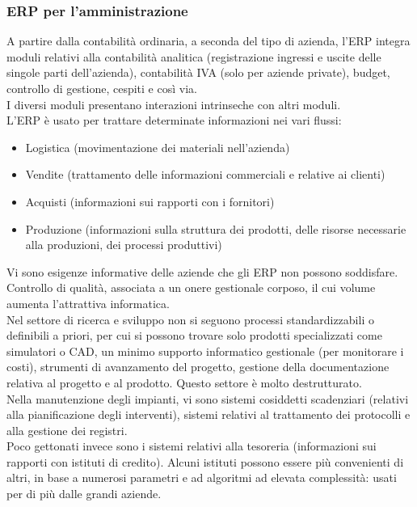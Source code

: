 \subsubsection{ERP per l'amministrazione}
\label{subs:ERP per l'amministrazione}
A partire dalla contabilit\`a ordinaria, a seconda del tipo di azienda, l'ERP integra moduli
relativi alla contabilit\`a analitica (registrazione ingressi e uscite delle singole parti dell'azienda),
contabilit\`a IVA (solo per aziende private), budget, controllo di gestione, cespiti e cos\`i via.\\
I diversi moduli presentano interazioni intrinseche con altri moduli. \\
L'ERP \`e usato per trattare determinate informazioni nei vari flussi:
\begin{itemize}
	\item Logistica (movimentazione dei materiali nell'azienda)
	\item Vendite (trattamento delle informazioni commerciali e relative ai clienti)
	\item Acquisti (informazioni sui rapporti con i fornitori)
	\item Produzione (informazioni sulla struttura dei prodotti, delle risorse necessarie
	alla produzioni, dei processi produttivi)
\end{itemize}
Vi sono esigenze informative delle aziende che gli ERP non possono soddisfare.\\
Controllo di qualit\`a, associata a un onere gestionale corposo, il cui volume aumenta
l'attrattiva informatica.\\
Nel settore di ricerca e sviluppo non si seguono processi standardizzabili o definibili
a priori, per cui si possono trovare solo prodotti specializzati come simulatori o CAD,
un minimo supporto informatico gestionale (per monitorare i costi), strumenti di avanzamento
del progetto, gestione della documentazione relativa al progetto e al prodotto. Questo settore
\`e molto destrutturato.\\
Nella manutenzione degli impianti, vi sono sistemi cosiddetti scadenziari (relativi alla pianificazione
degli interventi), sistemi relativi al trattamento dei protocolli e alla gestione dei registri.\\
Poco gettonati invece sono i sistemi relativi alla tesoreria (informazioni
sui rapporti con istituti di credito). Alcuni istituti possono essere pi\`u convenienti di altri,
in base a numerosi parametri e ad algoritmi ad elevata complessit\`a: usati per di pi\`u dalle grandi aziende.\\
